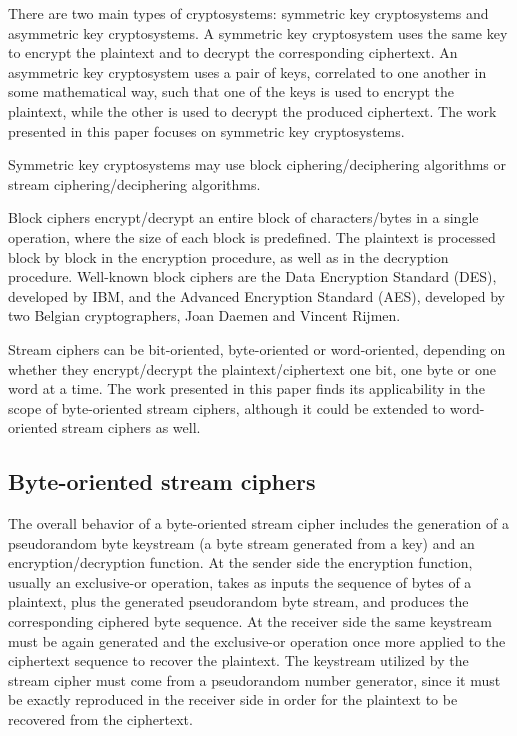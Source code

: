 \documentclass[conference]{IEEEtran}
\begin{document}
There are two main types of cryptosystems: symmetric key cryptosystems and asymmetric key cryptosystems. A symmetric key cryptosystem uses the same key to encrypt the plaintext and to decrypt the corresponding ciphertext. An asymmetric key cryptosystem uses a pair of keys, correlated to one another in some mathematical way, such that one of the keys is used to encrypt the plaintext, while the other is used to decrypt the produced ciphertext. The work presented in this paper focuses on symmetric key cryptosystems. 

Symmetric key cryptosystems may use block ciphering/deciphering algorithms or stream ciphering/deciphering algorithms. 

Block ciphers encrypt/decrypt an entire block of characters/bytes in a single operation, where the size of each block is predefined. The plaintext is processed block by block in the encryption procedure, as well as in the decryption procedure. Well-known block ciphers are the Data Encryption Standard (DES), developed by IBM, and the Advanced Encryption Standard (AES), developed by two Belgian cryptographers, Joan Daemen and Vincent Rijmen.

Stream ciphers can be bit-oriented, byte-oriented or word-oriented, depending on whether they encrypt/decrypt the plaintext/ciphertext one bit, one byte or one word at a time. The work presented in this paper finds its applicability in the scope of byte-oriented stream ciphers, although it could be extended to word-oriented stream ciphers as well.

\subsection{Byte-oriented stream ciphers}

The overall behavior of a byte-oriented stream cipher includes the generation of a pseudorandom byte keystream (a byte stream generated from a key) and an encryption/decryption function. At the sender side the encryption function, usually an exclusive-or operation, takes as inputs the sequence of bytes of a plaintext, plus the generated pseudorandom byte stream, and produces the corresponding ciphered byte sequence. At the receiver side the same keystream must be again generated and the exclusive-or operation once more applied to the ciphertext sequence to recover the plaintext. The keystream utilized by the stream cipher must come from a pseudorandom number generator, since it must be exactly reproduced in the receiver side in order for the plaintext to be recovered from the ciphertext.
\end{document}
